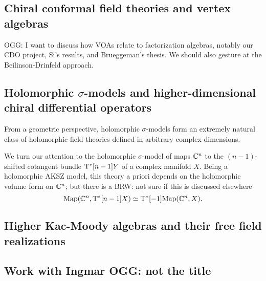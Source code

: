 \documentclass[11pt]{amsart}
\def\brian#1{{\textcolor{blue!65!red}{BRW: {#1}}}}
\def\owen#1{{\textcolor{green!65!black}{OGG: {#1}}}}
\begin{document}
\subsection{Chiral conformal field theories and vertex algebras}

\owen{I want to discuss how VOAs relate to factorization algebras, notably our CDO project, Si's results, and Brueggeman's thesis. We should also gesture at the Beilinson-Drinfeld approach.}

\subsection{Holomorphic $\sigma$-models and higher-dimensional chiral differential operators}

From a geometric perspective, holomorphic $\sigma$-models form an extremely natural class of holomorphic field theories defined in arbitrary complex dimensions. 

We turn our attention to the holomorphic $\sigma$-model of maps $\mathbb C^n$ to the $(n-1)$-shifted cotangent bundle ${\rm T}^*[n-1] Y$ of a complex manifold $X$. 
Being a holomorphic AKSZ model, this theory a priori depends on the holomorphic volume form on $\mathbb C^n$; but there is a 
\brian{not sure if this is discussed elsewhere}
\[
{\rm Map}(\mathbb C^n, {\rm T}^*[n-1] X) \simeq {\rm T}^*[-1] {\rm Map}(\mathbb C^n, X) .
\]


\subsection{Higher Kac-Moody algebras and their free field realizations}

\subsection{Work with Ingmar \owen{not the title}}
\end{document}
